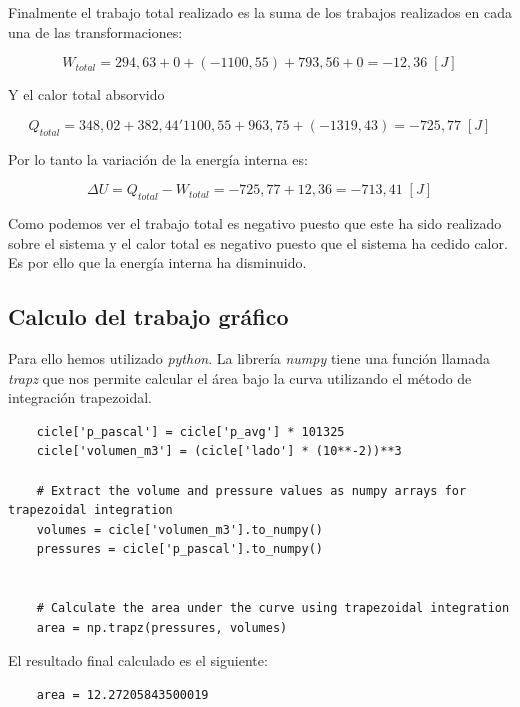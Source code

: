 \documentclass{article}
\begin{document}
Finalmente el trabajo total realizado es la suma de los trabajos realizados en cada una de las transformaciones:

\begin{equation}
    W_{total} = 294,63 + 0 + (-1100,55) + 793,56 + 0 = -12,36 \; [J]
\end{equation}

Y el calor total absorvido

\begin{equation}
    Q_{total} = 348,02 + 382,44 ' 1100,55 + 963,75 + (-1319,43) = - 725,77 \; [J]
\end{equation}

Por lo tanto la variación de la energía interna es:

\begin{equation}
    \Delta U = Q_{total} - W_{total} = -725,77 + 12,36 = -713,41 \; [J]
\end{equation}

Como podemos ver el trabajo total es negativo puesto que este ha sido realizado sobre el sistema y el calor total es negativo puesto que el sistema ha cedido calor.
Es por ello que la energía interna ha disminuido.

\subsection{Calculo del trabajo gráfico}

Para ello hemos utilizado \textit{python}. La librería \textit{numpy}
tiene una función llamada \textit{trapz} que nos permite calcular el área bajo
 la curva utilizando el método de integración trapezoidal.

\begin{verbatim}
    cicle['p_pascal'] = cicle['p_avg'] * 101325
    cicle['volumen_m3'] = (cicle['lado'] * (10**-2))**3

    # Extract the volume and pressure values as numpy arrays for trapezoidal integration
    volumes = cicle['volumen_m3'].to_numpy()
    pressures = cicle['p_pascal'].to_numpy()


    # Calculate the area under the curve using trapezoidal integration
    area = np.trapz(pressures, volumes)
\end{verbatim}

El resultado final calculado es el siguiente:

\begin{verbatim}
    area = 12.27205843500019
\end{verbatim}
\end{document}
